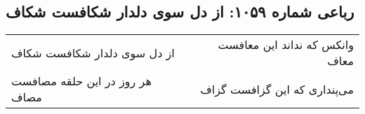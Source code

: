 \begin{center}
\section*{رباعی شماره ۱۰۵۹: از دل سوی دلدار شکافست شکاف}
\label{sec:1059}
\begin{longtable}{l p{0.5cm} r}
از دل سوی دلدار شکافست شکاف
&&
وانکس که نداند این معافست معاف
\\
هر روز در این حلقه مصافست مصاف
&&
می‌پنداری که این گزافست گزاف
\\
\end{longtable}
\end{center}
